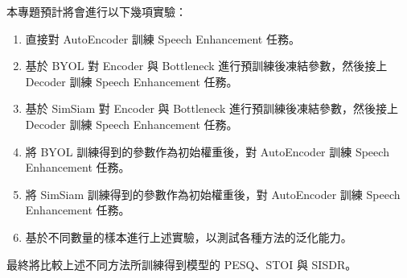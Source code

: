 \documentclass[10pt,twocolumn,letterpaper]{article}
\begin{document}
\begin{CJK}{UTF8}{bkai}

   本專題預計將會進行以下幾項實驗：
   \begin{enumerate}
      \item 直接對 AutoEncoder 訓練 Speech Enhancement 任務。
      \item 基於 BYOL 對 Encoder 與 Bottleneck 進行預訓練後凍結參數，然後接上 Decoder 訓練 Speech Enhancement 任務。
      \item 基於 SimSiam 對 Encoder 與 Bottleneck 進行預訓練後凍結參數，然後接上 Decoder 訓練 Speech Enhancement 任務。
      \item 將 BYOL 訓練得到的參數作為初始權重後，對 AutoEncoder 訓練 Speech Enhancement 任務。
      \item 將 SimSiam 訓練得到的參數作為初始權重後，對 AutoEncoder 訓練 Speech Enhancement 任務。
      \item 基於不同數量的樣本進行上述實驗，以測試各種方法的泛化能力。
   \end{enumerate}

   最終將比較上述不同方法所訓練得到模型的 PESQ\cite{PESQ}、STOI\cite{STOI} 與 SISDR\cite{SISDR}。


   {\small
   
   
   }
\end{CJK}
\end{document}
